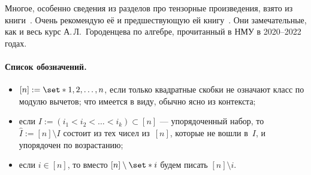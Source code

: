 Многое, особенно сведения из разделов про тензорные произведения, взято из книги~\cite{gorodentsev03}. Очень рекомендую её и предшествующую ей книгу~\cite{gorodentsev01}. Они замечательные, как и весь курс А.\,Л.~Городенцева по алгебре, прочитанный в НМУ в 2020--2022 годах.

\paragraph{Список обозначений.}
\begin{itemize}
	\item $[n] := \set*{1, 2, \dots, n}$, если только квадратные скобки не означают класс по модулю вычетов; что имеется в виду, обычно ясно из контекста;
	\item если $I := (i_1 < i_2 < \dots < i_k) \subset [n]$ --- упорядоченный набор, то
		$
			\hat{I} := [n] \setminus I
		$
		состоит из тех чисел из~$[n]$, которые не вошли в~$I$, и упорядочен по возрастанию;
	\item если $i \in [n]$, то вместо $[n] \setminus \set*{i}$ будем писать $[n] \setminus i$.
\end{itemize}

